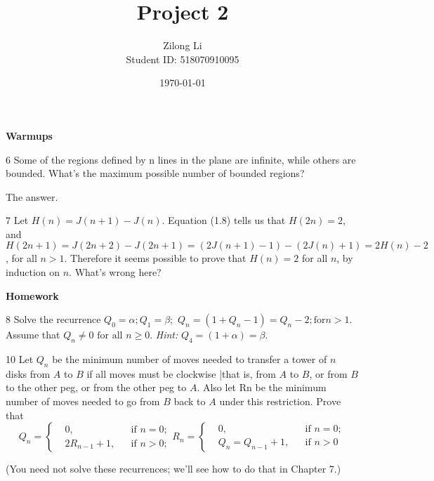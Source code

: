 \documentclass[a4paper,12pt]{article}
\title{Project 2}
\author{Zilong Li\\\small Student ID: 518070910095}
\date{\today}
\makeatletter
\newtheorem*{solution}{Solution}
\theoremstyle{definition}
\renewenvironment{solution}[1][Solution] {\par\pushQED{\qed}\normalfont\topsep6\p@\@plus6\p@\relax\trivlist\item[\hskip\labelsep\bfseries#1\@addpunct{.}]\ignorespaces}{\popQED\endtrivlist\@endpefalse} \makeatother
\newenvironment{problems}{\begin{list}{}{\renewcommand{\makelabel}[1]{\textbf{##1}\hfil}}}{\end{list}}
\makeatother
\begin{document}
\maketitle

\noindent\textbf{Warmups}

\begin{problems}
    \item[6] Some of the regions defined by n lines in the plane are infinite, while
    others are bounded. What's the maximum possible number of bounded
    regions?

    \begin{solution}
        The answer.
    \end{solution}

    \item[7] Let $H(n) = J(n + 1) - J(n)$. Equation (1.8) tells us that $H(2n) = 2$, and
    $H(2n+1) = J(2n+2)-J(2n+1) = (2J(n+1)-1) -  (2J(n)+1)= 2H(n)-2$, for all $n > 1$. Therefore it seems possible to prove that $H(n) = 2$ for all $n$, by induction on $n$. What's wrong here?

    \begin{solution}
        
    \end{solution}

\end{problems}

\noindent\textbf{Homework}

\begin{problems}
    \item[8] Solve the recurrence
    $Q_0 = \alpha ; Q_1 = \beta ;$
    $Q_n = (1 + Q_n-1)=Q_n-2 ; \text{for} n > 1.$
    Assume that $Q_n \neq 0 \text{ for all } n \geq 0.$ \emph{Hint:} $Q_4 = (1 + \alpha)=\beta.$
    \item[10] Let $Q_n$ be the minimum number of moves needed to transfer a tower of
    $n$ disks from $A$ to $B$ if all moves must be clockwise |that is, from $A$
    to $B$, or from $B$ to the other peg, or from the other peg to $A$. Also let Rn
    be the minimum number of moves needed to go from $B$ back to $A$ under
    this restriction. Prove that
    \begin{equation*}
            Q_n=\left\{
                \begin{aligned}
                    &0,&& \text{if } n=0;\\
                    &2R_{n-1}+1,&&\text{if } n>0; 
                \end{aligned}
            \right.
            R_n=\left\{
                \begin{aligned}
                &0,&&\text{if } n=0;\\
                &Q_n=Q_{n-1}+1,&&\text{if } n>0 
            \end{aligned}
                \right.
    \end{equation*}

    (You need not solve these recurrences; we'll see how to do that in Chapter
7.)
\end{problems}
\end{document}
